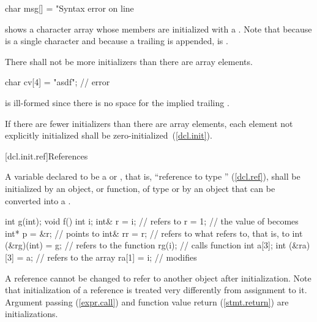 \begin{codeblock}
char msg[] = "Syntax error on line %
\end{codeblock}

shows a character array whose members are initialized
with a
.
Note that because
is a single character and
because a trailing
is appended,
is
.
\exitexample

\pnum
There shall not be more initializers than there are array elements.
\enterexample

\begin{codeblock}
char cv[4] = "asdf";            // error
\end{codeblock}

is ill-formed since there is no space for the implied trailing
.
\exitexample

\pnum
If there are fewer initializers than there are array elements, each element not
explicitly initialized shall be zero-initialized~(\ref{dcl.init}).

[dcl.init.ref]{References}%

\pnum
A variable declared to be a
 or ,
that is, ``reference to type
''
(\ref{dcl.ref}),
shall be initialized by an object, or function, of type
or by an object that can be converted into a
.
\enterexample

\begin{codeblock}
int g(int);
void f() {
  int i;
  int& r = i;                   //  refers to 
  r = 1;                        // the value of  becomes 
  int* p = &r;                  //  points to 
  int& rr = r;                  //  refers to what  refers to, that is, to 
  int (&rg)(int) = g;           //  refers to the function 
  rg(i);                        // calls function 
  int a[3];
  int (&ra)[3] = a;             //  refers to the array 
  ra[1] = i;                    // modifies 
}
\end{codeblock}
\exitexample

\pnum
A reference cannot be changed to refer to another object after initialization.
%
Note that initialization of a reference is treated very differently from assignment
to it.
%
Argument passing (\ref{expr.call})
%
and function value return (\ref{stmt.return}) are initializations.

